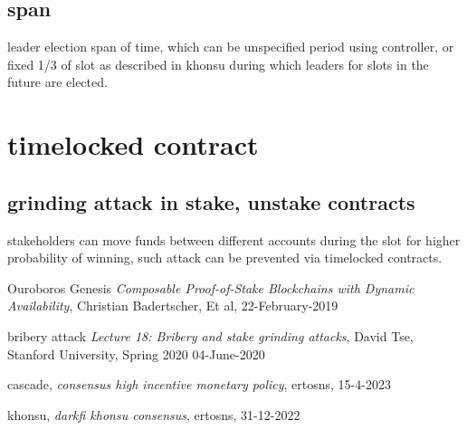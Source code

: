 \documentclass{article}
\begin{document}
\subsection {span}
leader election span of time, which can be unspecified period using controller, or fixed 1/3 of slot as described in khonsu \cite{khonsu} during which leaders for slots in the future are elected.

\section {timelocked contract}
\label{timelocked}
\subsection {grinding attack in stake, unstake contracts}
stakeholders can move funds between different accounts during the slot for higher probability of winning, such attack can be prevented via timelocked contracts.



\begin{thebibliography}{999}

  Ouroboros Genesis
  \emph{Composable Proof-of-Stake Blockchains with Dynamic Availability},
  Christian Badertscher, Et al,
  22-February-2019

  bribery attack
  \emph{Lecture 18: Bribery and stake grinding attacks},
  David Tse,
  Stanford University, Spring 2020
  04-June-2020

  cascade,
  \emph{consensus high incentive monetary policy},
  ertosns,
  15-4-2023

  khonsu,
  \emph{darkfi khonsu consensus},
  ertosns,
  31-12-2022


\end{thebibliography}
\end{document}

